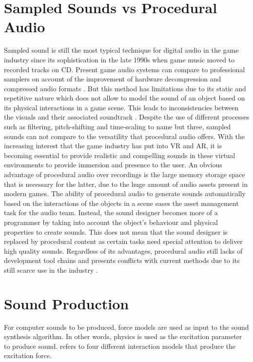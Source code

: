 \section{Sampled Sounds vs Procedural Audio}

Sampled sound is still the most typical technique for digital audio in the game industry since its sophistication in the late 1990s when game music moved to recorded tracks on CD. Present game audio systems can compare to professional samplers on account of the improvement of hardware decompression and compressed audio formats \cite{farnell2007introduction}. But this method has limitations due to its static and repetitive nature which does not allow to model the sound of an object based on its physical interactions in a game scene. This leads to inconsistencies between the visuals and their associated soundtrack \cite{picard2009expressive}. Despite the use of different processes such as filtering, pitch-shifting and time-scaling to name but three, sampled sounds can not compare to the versatility that procedural audio offers. With the increasing interest that the game industry has put into \gls{VR} and \gls{AR}, it is becoming essential to provide realistic and compelling sounds in these virtual environments to provide immersion and presence to the user. An obvious advantage of procedural audio over recordings is the large memory storage space that is necessary for the latter, due to the huge amount of audio assets present in modern games. The ability of procedural audio to generate sounds automatically based on the interactions of the objects in a scene eases the asset management task for the audio team. Instead, the sound designer becomes more of a programmer by taking into account the object’s behaviour and physical properties to create sounds. This does not mean that the sound designer is replaced by procedural content as certain tasks need special attention to deliver high quality sounds. Regardless of its advantages, procedural audio still lacks of development tool chains and presents conflicts with current methods due to its still scarce use in the industry \cite{farnell2010designing}.

\section{Sound Production}

For computer sounds to be produced, force models are used as input to the sound synthesis algorithm. In other words, physics is used as the excitation parameter to produce sound. \cite{van2003modal} refers to four different interaction models that produce the excitation force.

